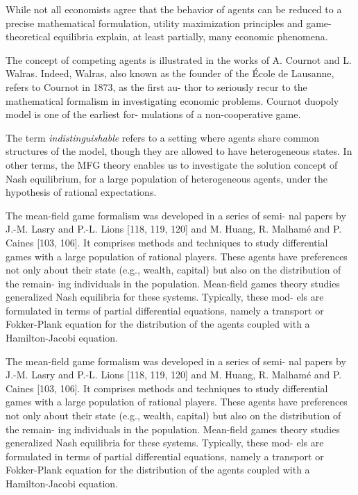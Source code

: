 \documentclass[
]{book}
\begin{document}
While not all economists agree that the behavior of agents can be reduced
to a precise mathematical formulation, utility maximization principles
and game-theoretical equilibria explain, at least partially, many
economic phenomena.

The concept of competing agents is illustrated in the works of A.
Cournot and L. Walras. Indeed, Walras, also known as the founder
of the École de Lausanne, refers to Cournot in 1873, as the first au-
thor to seriously recur to the mathematical formalism in investigating
economic problems. Cournot duopoly model is one of the earliest for-
mulations of a non-cooperative game.

The term \emph{indistinguishable} refers
to a setting where agents share common structures of the model,
though they are allowed to have heterogeneous states. In other terms,
the MFG theory enables us to investigate the solution concept of Nash
equilibrium, for a large population of heterogeneous agents, under the
hypothesis of rational expectations.

The mean-field game formalism was developed in a series of semi-
nal papers by J.-M. Lasry and P.-L. Lions {[}118, 119, 120{]} and M.
Huang, R. Malhamé and P. Caines {[}103, 106{]}. It comprises methods
and techniques to study differential games with a large population of
rational players. These agents have preferences not only about their
state (e.g., wealth, capital) but also on the distribution of the remain-
ing individuals in the population. Mean-field games theory studies
generalized Nash equilibria for these systems. Typically, these mod-
els are formulated in terms of partial differential equations, namely a
transport or Fokker-Plank equation for the distribution of the agents
coupled with a Hamilton-Jacobi equation.

The mean-field game formalism was developed in a series of semi-
nal papers by J.-M. Lasry and P.-L. Lions {[}118, 119, 120{]} and M.
Huang, R. Malhamé and P. Caines {[}103, 106{]}. It comprises methods
and techniques to study differential games with a large population of
rational players. These agents have preferences not only about their
state (e.g., wealth, capital) but also on the distribution of the remain-
ing individuals in the population. Mean-field games theory studies
generalized Nash equilibria for these systems. Typically, these mod-
els are formulated in terms of partial differential equations, namely a
transport or Fokker-Plank equation for the distribution of the agents
coupled with a Hamilton-Jacobi equation.
\end{document}

